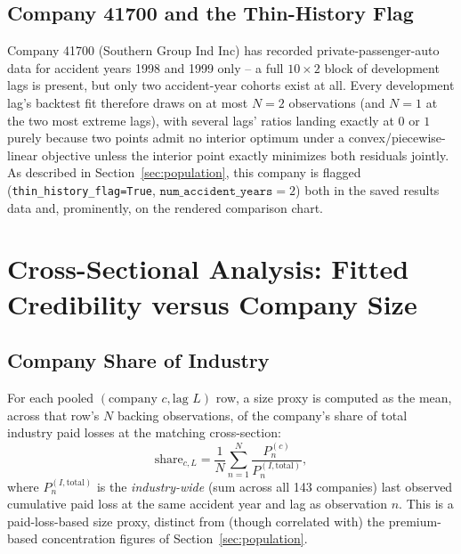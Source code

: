 \documentclass[11pt]{article}
\begin{document}
\subsection{Company 41700 and the Thin-History Flag}
\label{sec:thin}

Company 41700 (Southern Group Ind Inc) has recorded private-passenger-auto data for accident
years 1998 and 1999 only -- a full $10\times2$ block of development lags is present, but only two
accident-year cohorts exist at all. Every development lag's backtest fit therefore draws on at
most $N=2$ observations (and $N=1$ at the two most extreme lags), with several lags' ratios
landing exactly at $0$ or $1$ purely because two points admit no interior optimum under a
convex/piecewise-linear objective unless the interior point exactly minimizes both residuals
jointly. As described in Section~\ref{sec:population}, this company is flagged
(\texttt{thin\_history\_flag=True}, $\texttt{num\_accident\_years}=2$) both in the saved results
data and, prominently, on the rendered comparison chart.

\section{Cross-Sectional Analysis: Fitted Credibility versus Company Size}
\label{sec:crosssection}

\subsection{Company Share of Industry}

For each pooled $(\text{company } c, \text{lag } L)$ row, a size proxy is computed as the mean,
across that row's $N$ backing observations, of the company's share of total industry paid losses
at the matching cross-section:
\begin{equation}
\text{share}_{c,L} = \frac{1}{N}\sum_{n=1}^{N} \frac{P_n^{(c)}}{P_n^{(I,\text{total})}},
\label{eq:share}
\end{equation}
where $P_n^{(I,\text{total})}$ is the \emph{industry-wide} (sum across all 143 companies) last
observed cumulative paid loss at the same accident year and lag as observation $n$. This is a
paid-loss-based size proxy, distinct from (though correlated with) the premium-based concentration
figures of Section~\ref{sec:population}.
\end{document}
